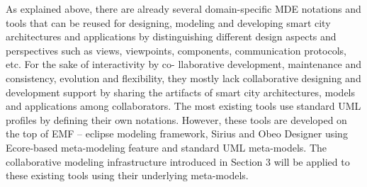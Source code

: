 As explained above, there are already several domain-specific MDE notations and tools that can be reused for designing, modeling and developing smart city architectures and applications by distinguishing different design aspects and perspectives such as views, viewpoints, components, communication protocols, etc. For the sake of interactivity by co- llaborative development, maintenance and consistency, evolution and flexibility, they mostly lack collaborative designing and development support by sharing the artifacts of smart city architectures, models and applications among collaborators. The most existing tools use standard UML profiles by defining their own notations. However, these tools are developed on the top of EMF – eclipse modeling framework, Sirius and Obeo Designer using Ecore-based meta-modeling feature and standard UML meta-models. The collaborative modeling infrastructure introduced in Section 3 will be applied to these existing tools using their underlying meta-models.



